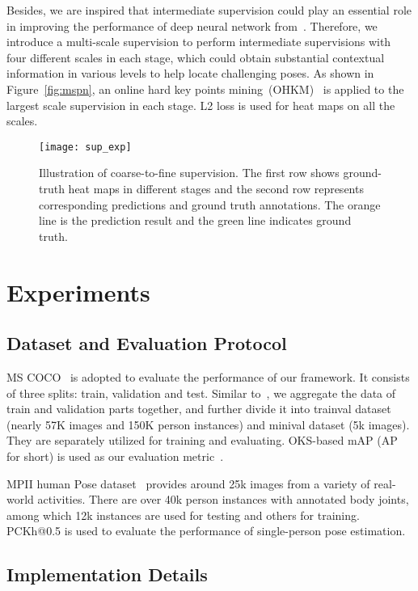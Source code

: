 \documentclass[10pt,twocolumn,letterpaper]{article}
\begin{document}
Besides, we are inspired that intermediate supervision could play an essential role in improving the performance of deep neural network from~\cite{szegedy2015going}. Therefore, we introduce a multi-scale supervision to perform intermediate supervisions with four different scales in each stage, which could obtain substantial contextual information in various levels to help locate challenging poses. As shown in Figure~\ref{fig:mspn}, an online hard key points mining~(OHKM)~\cite{chen2018cascaded} is applied to the largest scale supervision in each stage. L2 loss is used for heat maps on all the scales.

\begin{figure}
	\centering
	\texttt{[image: sup\_exp]}
	\caption{Illustration of coarse-to-fine supervision. The first row shows ground-truth heat maps in different stages and the second row represents corresponding predictions and ground truth annotations. The orange line is the prediction result and the green line indicates ground truth. }
	\label{fig:ctf}
\end{figure}


\section{Experiments}

\subsection{Dataset and Evaluation Protocol}
MS COCO~\cite{lin2014microsoft} is adopted to evaluate the performance of our framework. It consists of three splits: train, validation and test. Similar to~\cite{chen2018cascaded}, we aggregate the data of train and validation parts together, and further divide it into trainval dataset (nearly 57K images and 150K person instances) and minival dataset (5k images). They are separately utilized for training and evaluating. OKS-based mAP (AP for short) is used as our evaluation metric~\cite{lin2014microsoft}.

MPII human Pose dataset~\cite{andriluka20142d} provides around 25k images from a variety of real-world activities. There are over 40k person instances with annotated body joints, among which 12k instances are used for testing and others for training. PCKh@0.5 is used to evaluate the performance of single-person pose estimation.

\subsection{Implementation Details}
\end{document}
